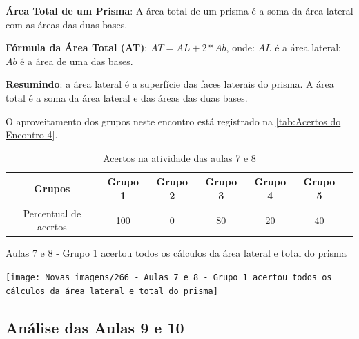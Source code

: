 \textbf{Área Total de um Prisma}: A área total de um prisma é a soma da área lateral com as áreas das duas bases.

\textbf{Fórmula da Área Total (AT)}: \textcolor[HTML]{0000FF}{$AT = AL + 2 * Ab$}, onde: $AL$ é a área lateral; $Ab$ é a área de uma das bases.

\textbf{Resumindo}: a área lateral é a superfície das faces laterais do prisma. A área total é a soma da área lateral e das áreas das duas bases.

O aproveitamento dos grupos neste encontro está registrado na \autoref{tab:Acertos do Encontro 4}.

\begin{table}[htbp] \centering
    \caption{Acertos na atividade das aulas 7 e 8} \label{tab:Acertos do Encontro 4}
    \begin{tabular}{|c|c|c|c|c|c|c|}
        \hline
        \textbf{Grupos}       & \textbf{Grupo 1} & \textbf{Grupo 2} & \textbf{Grupo 3} & \textbf{Grupo 4} & \textbf{Grupo 5} \\
        \hline
        Percentual de acertos & 100              & 0                & 80               & 20               & 40               \\
        \hline
    \end{tabular}
    \legend{\legendaTabela}
\end{table}

\begin{CenteredFigure}
    \caption{Aulas 7 e 8 - Grupo 1 acertou todos os cálculos da área lateral e total do prisma} \label{fig: 266 - Aulas 7 e 8 - Grupo 1 acertou todos os calculos da area lateral e total do prisma}
    \texttt{[image: Novas imagens/266 - Aulas 7 e 8 - Grupo 1 acertou todos os cálculos da área lateral e total do prisma]}
    \legend{\autoria}
\end{CenteredFigure}


\subsection{Análise das Aulas 9 e 10}

